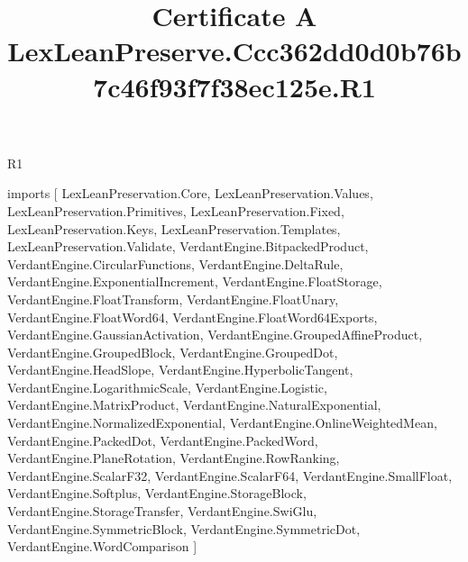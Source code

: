 \begin{lexlean}{R1}
\title{Certificate A LexLeanPreserve.Ccc362dd0d0b76b7c46f93f7f38ec125e.R1}
\begin{coremodule}
imports [
  LexLeanPreservation.Core,
  LexLeanPreservation.Values,
  LexLeanPreservation.Primitives,
  LexLeanPreservation.Fixed,
  LexLeanPreservation.Keys,
  LexLeanPreservation.Templates,
  LexLeanPreservation.Validate,
  VerdantEngine.BitpackedProduct,
  VerdantEngine.CircularFunctions,
  VerdantEngine.DeltaRule,
  VerdantEngine.ExponentialIncrement,
  VerdantEngine.FloatStorage,
  VerdantEngine.FloatTransform,
  VerdantEngine.FloatUnary,
  VerdantEngine.FloatWord64,
  VerdantEngine.FloatWord64Exports,
  VerdantEngine.GaussianActivation,
  VerdantEngine.GroupedAffineProduct,
  VerdantEngine.GroupedBlock,
  VerdantEngine.GroupedDot,
  VerdantEngine.HeadSlope,
  VerdantEngine.HyperbolicTangent,
  VerdantEngine.LogarithmicScale,
  VerdantEngine.Logistic,
  VerdantEngine.MatrixProduct,
  VerdantEngine.NaturalExponential,
  VerdantEngine.NormalizedExponential,
  VerdantEngine.OnlineWeightedMean,
  VerdantEngine.PackedDot,
  VerdantEngine.PackedWord,
  VerdantEngine.PlaneRotation,
  VerdantEngine.RowRanking,
  VerdantEngine.ScalarF32,
  VerdantEngine.ScalarF64,
  VerdantEngine.SmallFloat,
  VerdantEngine.Softplus,
  VerdantEngine.StorageBlock,
  VerdantEngine.StorageTransfer,
  VerdantEngine.SwiGlu,
  VerdantEngine.SymmetricBlock,
  VerdantEngine.SymmetricDot,
  VerdantEngine.WordComparison
]


\end{coremodule}
\end{lexlean}
